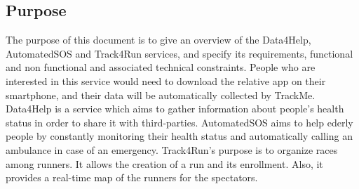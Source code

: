 \color{black}
{\color{secblue}\subsection{Purpose}} The purpose of this document is to give an overview of the Data4Help, AutomatedSOS and Track4Run services, and specify its requirements, functional and non functional and associated technical constraints.
People who are interested in this service would need to download the relative app on their smartphone, and their data will be automatically collected by TrackMe.
Data4Help is a service which aims to gather information about people's health status in order to share it with third-parties.
AutomatedSOS aims to help ederly people by constantly monitoring their health status and automatically calling an ambulance in case of an emergency.
Track4Run's purpose is to organize races among runners. It allows the creation of a run and its enrollment. Also, it provides a real-time map of the runners for the spectators.


